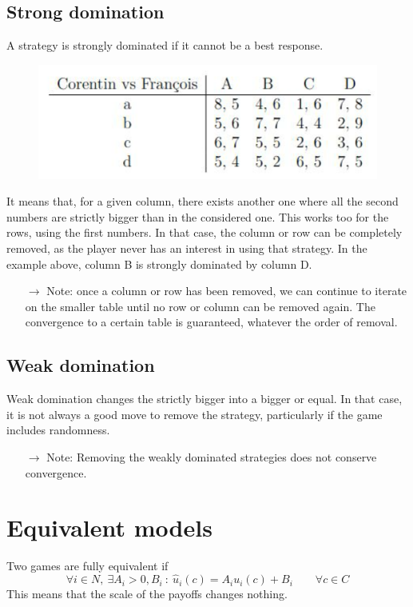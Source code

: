 \documentclass[12pt, openany]{report}
\theoremstyle{definition}
\begin{document}
\subsection{Strong domination}
A strategy is strongly dominated if it cannot be a best response. 
\begin{figure}[H]
	\centering 
	\includegraphics[scale=.15]{img/strong_dom.png}
\end{figure}
It means that, for a given column, there exists another one where all the second numbers are strictly bigger than in the considered one. This works too for the rows, using the first numbers. In that case, the column or row can be completely removed, as the player never has an interest in using that strategy. In the example above, column B is strongly dominated by column D.
\begin{itemize}
	\item [$\rightarrow$] Note: once a column or row has been removed, we can continue to iterate on the smaller table until no row or column can be removed again. The convergence to a certain table is guaranteed, whatever the order of removal.
\end{itemize}
\subsection{Weak domination}
Weak domination changes the strictly bigger into a bigger or equal. In that case, it is not always a good move to remove the strategy, particularly if the game includes randomness. 
\begin{itemize}
	\item [$\rightarrow$] Note: Removing the weakly dominated strategies does not conserve convergence. 
\end{itemize}
\section{Equivalent models}
Two games are fully equivalent if 
\begin{equation}
	\forall i \in N, \ \exists A_i>0, B_i\ : \ \hat u_i(c) = A_iu_i(c)+B_i \qquad \forall c\in C
\end{equation}
This means that the scale of the payoffs changes nothing. 
\end{document}
